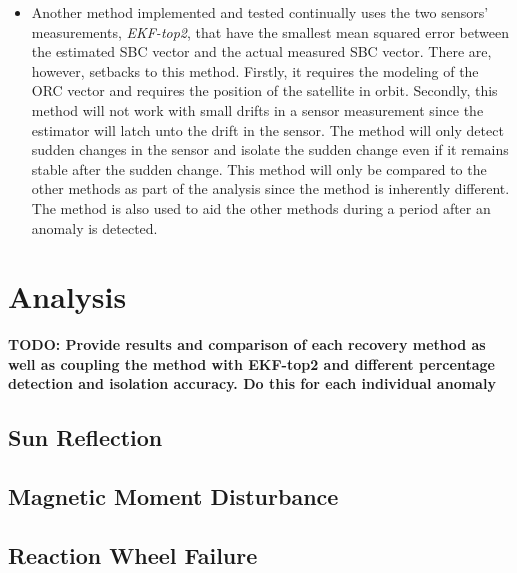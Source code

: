 \begin{itemize}
	\item Another method implemented and tested continually uses the two sensors' measurements, \emph{EKF-top2}, that have the smallest mean squared error between the estimated SBC vector and the actual measured SBC vector. There are, however, setbacks to this method. Firstly, it requires the modeling of the ORC vector and requires the position of the satellite in orbit. Secondly, this method will not work with small drifts in a sensor measurement since the estimator will latch unto the drift in the sensor. The method will only detect sudden changes in the sensor and isolate the sudden change even if it remains stable after the sudden change. This method will only be compared to the other methods as part of the analysis since the method is inherently different. The method is also used to aid the other methods during a period after an anomaly is detected.
\end{itemize}

\section{Analysis}
\textbf{TODO: Provide results and comparison of each recovery method as well as coupling the method with EKF-top2 and different percentage detection and isolation accuracy. Do this for each individual anomaly}

\subsection{Sun Reflection}

\subsection{Magnetic Moment Disturbance}

\subsection{Reaction Wheel Failure}